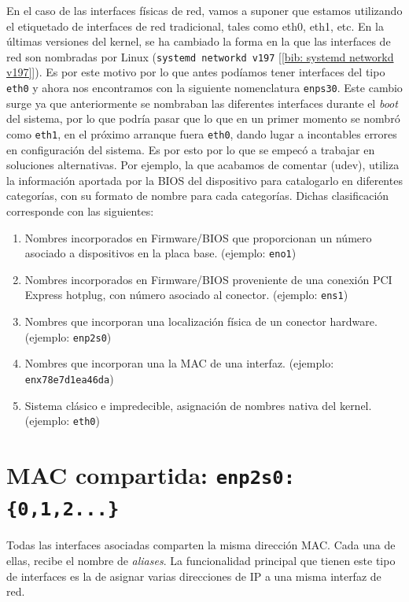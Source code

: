 \documentclass[a4paper, oneside, 12pt]{book}
\begin{document}
	\noindent En el caso de las interfaces físicas de red, vamos a suponer que estamos utilizando el etiquetado de interfaces de red tradicional, tales como eth0, eth1, etc. En la últimas versiones del kernel, se ha cambiado la forma en la que las interfaces de red son nombradas por Linux (\texttt{systemd networkd v197} [\ref{bib: systemd networkd v197}]). Es por este motivo por lo que antes podíamos tener interfaces del tipo \texttt{eth0} y ahora nos encontramos con la siguiente nomenclatura \texttt{enps30}. Este cambio surge ya que anteriormente se nombraban las diferentes interfaces durante el \textit{boot} del sistema, por lo que podría pasar que lo que en un primer momento se nombró como \texttt{eth1}, en el próximo arranque fuera \texttt{eth0}, dando lugar a incontables errores en configuración del sistema. Es por esto por lo que se empecó a trabajar en soluciones alternativas. Por ejemplo, la que acabamos de comentar (udev), utiliza la información aportada por la BIOS del dispositivo para catalogarlo en diferentes categorías, con su formato de nombre para cada categorías. Dichas clasificación corresponde con las siguientes:
	\begin{enumerate}
		\item Nombres incorporados en Firmware/BIOS que proporcionan un número asociado a dispositivos en la placa base. (ejemplo: \texttt{eno1})
		\item Nombres incorporados en Firmware/BIOS proveniente de una conexión PCI Express hotplug, con número asociado al conector. (ejemplo: \texttt{ens1})
		\item Nombres que incorporan una localización física de un conector hardware. (ejemplo: \texttt{enp2s0})
		\item Nombres que incorporan una la MAC de una interfaz. (ejemplo: \texttt{enx78e7d1ea46da})
		\item Sistema clásico e impredecible, asignación de nombres nativa del kernel. (ejemplo: \texttt{eth0})
	\end{enumerate}
	
	\pagebreak
	
	\section{MAC compartida: \texttt{enp2s0:\{0,1,2...\}}}
	\par \noindent Todas las interfaces asociadas comparten la misma dirección MAC. Cada una de ellas, recibe el nombre de \textit{aliases}. La funcionalidad principal que tienen este tipo de interfaces es la de asignar varias direcciones de IP a una misma interfaz de red.
	
\end{document}
